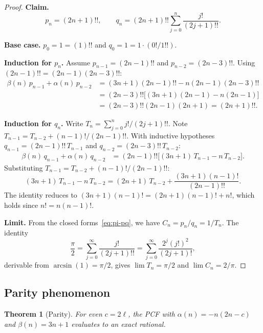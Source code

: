 \documentclass[11pt,a4paper]{article}
\theoremstyle{plain}
\newtheorem{theorem}{Theorem}[section]
\theoremstyle{definition}
\theoremstyle{remark}
\begin{document}
\begin{proof}
\textbf{Claim.}
\begin{equation}\label{eq:pi-pq}
  p_n = (2n{+}1)!!, \qquad
  q_n = (2n{+}1)!! \sum_{j=0}^{n} \frac{j!}{(2j{+}1)!!}.
\end{equation}

\textbf{Base case.}
$p_0 = 1 = (1)!!$ and $q_0 = 1 = 1\cdot(0!/1!!)$.

\medskip\noindent\textbf{Induction for $p_n$.}
Assume $p_{n-1} = (2n{-}1)!!$ and $p_{n-2} = (2n{-}3)!!$.
Using $(2n{-}1)!! = (2n{-}1)(2n{-}3)!!$:
\begin{align*}
  \beta(n)\,p_{n-1} + \alpha(n)\,p_{n-2}
  &= (3n{+}1)(2n{-}1)!! - n(2n{-}1)(2n{-}3)!! \\
  &= (2n{-}3)!!\bigl[(3n{+}1)(2n{-}1) - n(2n{-}1)\bigr] \\
  &= (2n{-}3)!!(2n{-}1)(2n{+}1) = (2n{+}1)!!.
\end{align*}

\medskip\noindent\textbf{Induction for $q_n$.}
Write $T_n = \sum_{j=0}^{n} j!/(2j{+}1)!!$.
Note $T_{n-1} = T_{n-2} + (n{-}1)!/(2n{-}1)!!$.
With inductive hypotheses
$q_{n-1} = (2n{-}1)!!\,T_{n-1}$ and $q_{n-2} = (2n{-}3)!!\,T_{n-2}$:
\begin{align*}
\beta(n)\,q_{n-1} + \alpha(n)\,q_{n-2}
&= (2n{-}1)!!\bigl[(3n{+}1)\,T_{n-1} - n\,T_{n-2}\bigr].
\end{align*}
Substituting $T_{n-1} = T_{n-2} + (n{-}1)!/(2n{-}1)!!$:
\[
  (3n{+}1)\,T_{n-1} - n\,T_{n-2}
  = (2n{+}1)\,T_{n-2} + \frac{(3n{+}1)(n{-}1)!}{(2n{-}1)!!}.
\]
The identity reduces to
$(3n{+}1)(n{-}1)! = (2n{+}1)(n{-}1)! + n!$,
which holds since $n! = n(n{-}1)!$.

\medskip\noindent\textbf{Limit.}
From the closed forms~\eqref{eq:pi-pq}, we have $C_n = p_n/q_n = 1/T_n$.
The identity~\cite[\S5.2]{cuyt2008}
\begin{equation}\label{eq:pi-id}
  \frac{\pi}{2}
  = \sum_{j=0}^{\infty} \frac{j!}{(2j{+}1)!!}
  = \sum_{j=0}^{\infty} \frac{2^j(j!)^2}{(2j{+}1)!},
\end{equation}
derivable from $\arcsin(1) = \pi/2$,
gives $\lim T_n = \pi/2$ and $\lim C_n = 2/\pi$.
\end{proof}

\subsection{Parity phenomenon}\label{sec:parity}

\begin{theorem}[Parity]\label{thm:parity}
For even $c = 2\ell$, the PCF with $\alpha(n) = -n(2n{-}c)$ and
$\beta(n) = 3n+1$ evaluates to an exact rational.
\end{theorem}
\end{document}
